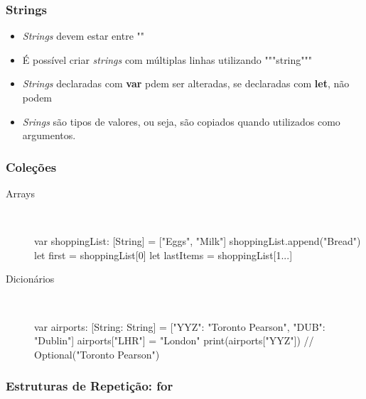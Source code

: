 \begin{frame}[fragile]
    \frametitle{Strings}

    \begin{itemize}
        \item \textit{Strings} devem estar entre ""
        \item É possível criar \textit{strings} com múltiplas linhas
        utilizando """string"""
        \item \textit{Strings} declaradas com \textbf{var} pdem ser
        alteradas, se declaradas com \textbf{let}, não podem
        \item \textit{Srings} são tipos de valores, ou seja, são copiados
        quando utilizados como argumentos.
    \end{itemize}
\end{frame}

\begin{frame}[fragile]
    \frametitle{Coleções}

    \begin{description}
        \item[Arrays] \hfill \\
        \begin{swift}
    var shoppingList: [String] = ["Eggs", "Milk"]
    shoppingList.append("Bread")
    let first = shoppingList[0]
    let lastItems = shoppingList[1...]
        \end{swift}
        \item[Dicionários] \hfill \\
        \begin{swift}
    var airports: [String: String] =
        ["YYZ": "Toronto Pearson", "DUB": "Dublin"]
    airports["LHR"] = "London"
    print(airports["YYZ"])  // Optional("Toronto Pearson")
        \end{swift}
    \end{description}
\end{frame}

\begin{frame}[fragile]
    \frametitle{Estruturas de Repetição: \textbf{for}}

\end{frame}

